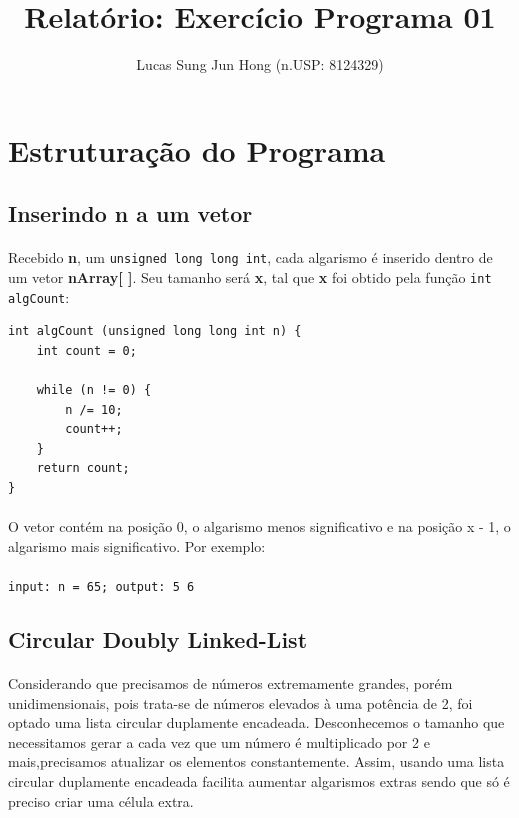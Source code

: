 \documentclass[10pt,a4paper]{article}
\title{Relatório: Exercício Programa 01}
\author{Lucas Sung Jun Hong  (n.USP: 8124329)}
\begin{document}
\newpage
\maketitle
\newpage

\newpage
\tableofcontents
\newpage
\section{Estruturação do Programa}
	\subsection{Inserindo n a um vetor}
		\paragraph*{} Recebido {\bf n}, um {\tt unsigned long long int}, cada algarismo é inserido dentro de um vetor {\bf nArray[ ]}. Seu tamanho será {\bf x}, tal que {\bf x} foi obtido pela função {\tt int algCount}:
		\begin{lstlisting}
int algCount (unsigned long long int n) {
    int count = 0;

    while (n != 0) {
        n /= 10;
        count++;
    }
    return count;
}
		\end{lstlisting}

		\paragraph*{} O vetor contém na posição 0, o algarismo menos significativo e na posição x - 1, o algarismo mais significativo. Por exemplo:
		\paragraph*{} {\tt input: n = 65;  output: 5 6}

	\subsection{Circular Doubly Linked-List}
		\paragraph*{} Considerando que precisamos de números extremamente grandes, porém unidimensionais, pois trata-se de números elevados à uma potência de 2, foi optado uma lista circular duplamente encadeada. Desconhecemos o tamanho que necessitamos gerar a cada vez que um número é multiplicado por 2 e mais,precisamos atualizar os elementos constantemente. Assim, usando uma lista circular duplamente encadeada  facilita aumentar  algarismos extras sendo que só é preciso criar uma célula extra.
\end{document}
